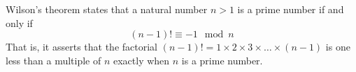 \documentclass[12pt, a4paper]{article}
\begin{document}
Wilson's theorem states that a natural number $n > 1$ is a prime number if and only if \[(n-1)! \equiv -1 \mod n\]
That is, it asserts that the factorial $(n-1)! = 1 \times 2 \times 3 \times \ldots \times (n-1) $ is one less than a multiple of $n$
exactly when $n$ is a prime number. 
\end{document}
